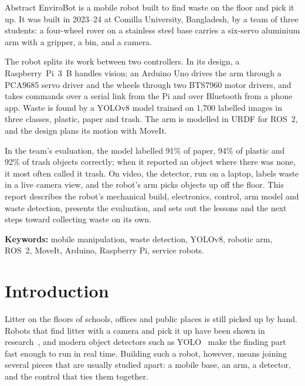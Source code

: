 \documentclass[11pt]{article}
\begin{document}
\vspace{6pt}
\begin{summarybox}{Abstract}
EnviroBot is a mobile robot built to find waste on the floor and pick it up. It was built in 2023--24 at Comilla University, Bangladesh, by a team of three students: a four-wheel rover on a stainless steel base carries a six-servo aluminium arm with a gripper, a bin, and a camera.

The robot splits its work between two controllers. In its design, a Raspberry~Pi~3~B handles vision; an Arduino Uno drives the arm through a PCA9685 servo driver and the wheels through two BTS7960 motor drivers, and takes commands over a serial link from the Pi and over Bluetooth from a phone app. Waste is found by a YOLOv8 model trained on 1,700 labelled images in three classes, plastic, paper and trash. The arm is modelled in URDF for ROS~2, and the design plans its motion with MoveIt.

In the team's evaluation, the model labelled 91\% of paper, 94\% of plastic and 92\% of trash objects correctly; when it reported an object where there was none, it most often called it trash. On video, the detector, run on a laptop, labels waste in a live camera view, and the robot's arm picks objects up off the floor. This report describes the robot's mechanical build, electronics, control, arm model and waste detection, presents the evaluation, and sets out the lessons and the next steps toward collecting waste on its own.

\smallskip
{\sffamily\small\textbf{Keywords:} mobile manipulation, waste detection, YOLOv8, robotic arm, ROS~2, MoveIt, Arduino, Raspberry Pi, service robots.}
\end{summarybox}

\section{Introduction}

Litter on the floors of schools, offices and public places is still picked up by hand. Robots that find litter with a camera and pick it up have been shown in research~\cite{bai2018garbage}, and modern object detectors such as YOLO~\cite{redmon2016yolo} make the finding part fast enough to run in real time. Building such a robot, however, means joining several pieces that are usually studied apart: a mobile base, an arm, a detector, and the control that ties them together.
\end{document}
